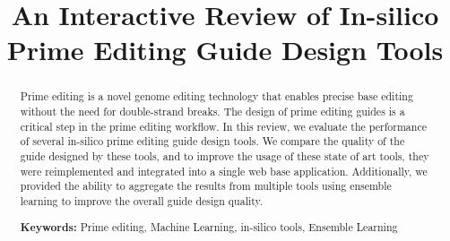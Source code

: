 \documentclass[12pt]{article}
\title{An Interactive Review of In-silico Prime Editing Guide Design Tools}
\begin{document}
\date{}
\maketitle

\begin{abstract}
    Prime editing is a novel genome editing technology that enables precise base editing without the need for double-strand breaks. The design of prime editing guides is a critical step in the prime editing workflow. In this review, we evaluate the performance of several in-silico prime editing guide design tools. We compare the quality of the guide designed by these tools, and to improve the usage of these state of art tools, they were reimplemented and integrated into a single web base application. Additionally, we provided the ability to aggregate the results from multiple tools using ensemble learning to improve the overall guide design quality.

    \textbf{Keywords:} Prime editing, Machine Learning, in-silico tools, Ensemble Learning
\end{abstract}

\newpage






\newpage
\appendix



\newpage
\printbibliography
\end{document}

